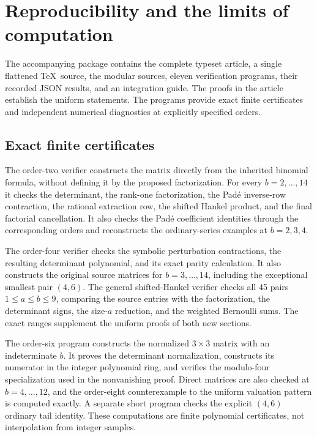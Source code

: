 \section{Reproducibility and the limits of computation}
\label{sec:verification}

The accompanying package contains the complete typeset article, a single
flattened \TeX\ source, the modular sources, eleven verification programs,
their recorded JSON results, and an integration guide. The proofs in the
article establish the uniform statements. The programs provide exact
finite certificates and independent numerical diagnostics at explicitly
specified orders.

\subsection{Exact finite certificates}

The order-two verifier constructs the matrix directly from the inherited
binomial formula, without defining it by the proposed factorization.
For every $b=2,\ldots,14$ it checks the determinant, the rank-one
factorization, the Pad\'e inverse-row contraction, the rational extraction
row, the shifted Hankel product, and the final factorial cancellation.
It also checks the Pad\'e coefficient identities through the corresponding
orders and reconstructs the ordinary-series examples at $b=2,3,4$.

The order-four verifier checks the symbolic perturbation contractions,
the resulting determinant polynomial, and its exact parity calculation.
It also constructs the original source matrices for $b=3,\ldots,14$,
including the exceptional smallest pair $(4,6)$. The general shifted-Hankel
verifier checks all 45 pairs $1\le a\le b\le9$, comparing the source
entries with the factorization, the determinant signs, the size-$a$
reduction, and the weighted Bernoulli sums. The exact ranges supplement
the uniform proofs of both new sections.

The order-six program constructs the normalized $3\times3$ matrix with
an indeterminate $b$. It proves the determinant normalization, constructs
its numerator in the integer polynomial ring, and verifies the modulo-four
specialization used in the nonvanishing proof. Direct matrices are also
checked at $b=4,\ldots,12$, and the order-eight counterexample to the
uniform valuation pattern is computed exactly. A separate short program
checks the explicit $(4,6)$ ordinary tail identity. These computations
are finite polynomial certificates, not interpolation from integer samples.

